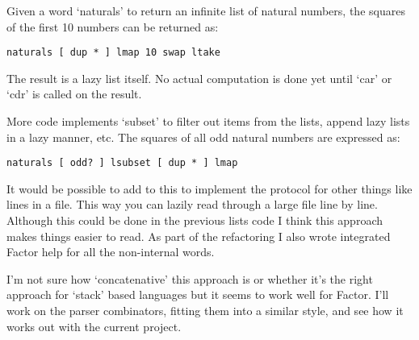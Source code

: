Given a word `naturals' to return an infinite list of natural numbers,
 the squares of the first 10 numbers can be returned as:

\begin{verbatim}
naturals [ dup * ] lmap 10 swap ltake
\end{verbatim}


The result is a lazy list itself. No actual computation is done yet
until `car' or `cdr' is called on the result.

More code implements `subset' to filter out items from the lists,
append lazy lists in a lazy manner, etc. The squares of all odd
natural numbers are expressed as:

\begin{verbatim}
naturals [ odd? ] lsubset [ dup * ] lmap
\end{verbatim}


It would be possible to add to this to implement the protocol for
other things like lines in a file. This way you can lazily read
through a large file line by line. Although this could be done in the
previous lists code I think this approach makes things easier to
read. As part of the refactoring I also wrote integrated Factor help
for all the non-internal words.

I'm not sure how `concatenative' this approach is or whether it's the
right approach for `stack' based languages but it seems to work well
for Factor. I'll work on the parser combinators, fitting them into a
similar style, and see how it works out with the current project.


